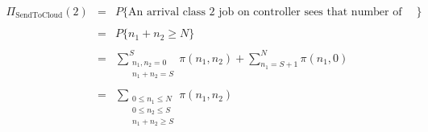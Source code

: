 \documentclass[10pt,a4paper]{article}
\begin{document}
\begin{center}
\begin{equation}
\begin{array} {lcl} 
\Pi_{\text{SendToCloud}}(2) & = & P\lbrace{\text{An arrival class 2 job on controller sees that number of jobs in cloudlet exceed or is equal to a given threshold S}}\rbrace \\ 
\\
& = & P\lbrace{n_1 + n_2 \geq N}\rbrace \\ 
\\
& = & \displaystyle \sum_{\substack{n_1,n_2 = 0 \\ n_1 + n_2 = S}}^{S} \pi(n_1,n_2) + \sum_{n_1 = S+1}^{N}\pi(n_1,0) \\
\\
& = & \displaystyle \sum_{\substack{0 \leq n_1 \leq N \\ 0 \leq n_2 \leq S \\ n_1 + n_2 \geq S}} \pi(n_1,n_2)
\end{array}
\end{equation}
\end{center}
\end{document}
